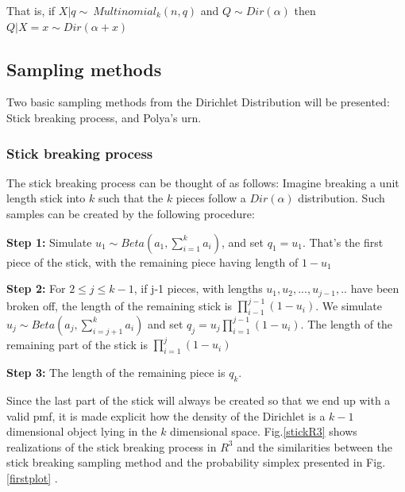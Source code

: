\documentclass[twoside,hidelinks]{article}
\begin{document}
That is,  if $ X|q \sim\ Multinomial_k(n,q) $ and $ Q \sim Dir( \alpha ) $ then $ Q| X=x \sim Dir( \alpha + x) $

\subsection{Sampling methods}

Two basic sampling methods from the Dirichlet Distribution will be presented: Stick breaking process, and Polya's urn.

\subsubsection{Stick breaking process}

The stick breaking process can be thought of as follows: Imagine breaking a unit length stick into $k$ such that the $k$ pieces follow a $Dir( \alpha)$  distribution. Such samples can be created by the following procedure:
\begin{compactitem}
	\item  \textbf{Step 1:} Simulate $ u_1 \sim Beta(a_1, \sum_{i=1}^k a_i ) $, and set $q_1 = u_1$. That's the first piece of the stick, with the remaining piece having length of $ 1-u_1$
	\item \textbf{Step 2:} For $ 2 \leq j \leq k-1$, if j-1 pieces, with lengths  $u_1,u_2,...,u_{j-1},..$ have been broken off, the length of the remaining stick is $\prod_{i-1}^{j-1} (1 - u_i) $. We simulate $ u_j \sim Beta( a_j, \sum_{i=j+1}^k a_i) $ and set  $q_j=u_j \prod_{i=1}^{j-1}(1-u_i)$. The length of the remaining part of the stick is  $\prod_{i=1}^{j}(1-u_i)$
	\item  \textbf{Step 3:} The length of the remaining piece is $q_k$.


\end{compactitem}
Since the last part of the stick will always be created so that we end up with a valid pmf, it is made explicit how the density of the Dirichlet is  a ${k-1}$ dimensional object lying in the $k$ dimensional space. Fig.\ref{stickR3} shows realizations of the stick breaking process in $R^3$ and the similarities between the stick breaking sampling method and the probability simplex presented in Fig.\ref{firstplot} .
\end{document}

